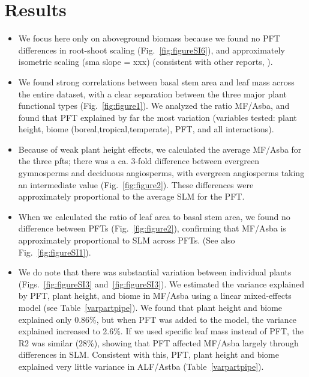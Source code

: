 \documentclass[a4paper]{article}\usepackage[]{graphicx}\usepackage[]{color}
\begin{document}
\section{Results}

\begin{itemize}

\item We focus here only on aboveground biomass because we found no PFT differences in root-shoot scaling (Fig.~\ref{fig:figureSI6}), and approximately isometric scaling (sma slope = xxx) (consistent with other reports, \cite{hui_near_2014, cairns_root_1997}).

\item We found strong correlations between basal stem area and leaf mass across the entire dataset, with a clear separation between the three major plant functional types (Fig.~\ref{fig:figure1}). We analyzed the ratio MF/Asba, and found that PFT explained by far the most variation (variables tested: plant height, biome (boreal,tropical,temperate), PFT, and all interactions).

\item Because of weak plant height effects, we calculated the average MF/Asba for the three pfts; there was a ca. 3-fold difference between evergreen gymnosperms and deciduous angiosperms, with evergreen angiosperms taking an intermediate value (Fig.~\ref{fig:figure2}). These differences were approximately proportional to the average SLM for the PFT. 

\item When we calculated the ratio of leaf area to basal stem area, we found no difference between PFTs (Fig.~\ref{fig:figure2}), confirming that MF/Asba is approximately proportional to SLM across PFTs. (See also Fig.~\ref{fig:figureSI1}).

\item We do note that there was substantial variation between individual plants (Figs.~\ref{fig:figureSI3} and~\ref{fig:figureSI3}). We estimated the variance explained by PFT, plant height, and biome in MF/Asba using a linear mixed-effects model (see Table~\ref{varpartpipe}). We found that plant height and biome explained only 0.86\%, but when PFT was added to the model, the variance explained increased to 2.6\%. If we used specific leaf mass instead of PFT, the R2 was similar (28\%), showing that PFT affected MF/Asba largely through differences in SLM. Consistent with this, PFT, plant height and biome explained very little variance in ALF/Astba (Table~\ref{varpartpipe}).


\end{itemize}
\end{document}
